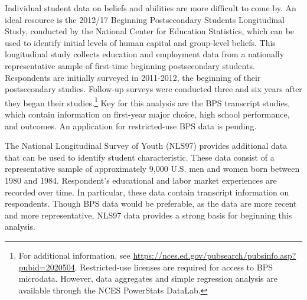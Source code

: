 Individual student data on beliefs and abilities are more difficult to come by.
An ideal resource is the 2012/17 Beginning Postsecondary Students Longitudinal Study, conducted by the National Center for Education Statistics, which can be used to identify initial levels of human capital and group-level beliefs. 
This longitudinal study collects education and employment data from a nationally representative sample of first-time beginning postsecondary students.
Respondents are initially surveyed in 2011-2012, the beginning of their postsecondary studies. 
Follow-up surveys were conducted three and six years after they began their studies.\footnote{
    For additional information, see \url{https://nces.ed.gov/pubsearch/pubsinfo.asp?pubid=2020504}.
    Restricted-use licenses are required for access to BPS microdata. 
    However, data aggregates and simple regression analysis are available through the NCES PowerStats DataLab. 
}
Key for this analysis are the BPS transcript studies, which contain information on first-year major choice, high school performance, and outcomes. 
An application for restricted-use BPS data is pending. 

The National Longitudinal Survey of Youth (NLS97) provides additional data that can be used to identify student characteristic.
These data consist of a representative sample of approximately 9,000 U.S. men and women born between 1980 and 1984.
Respondent's educational and labor market experiences are recorded over time. 
In particular, these data contain transcript information on respondents.
Though BPS data would be preferable, as the data are more recent and more representative, NLS97 data provides a strong basis for beginning this analysis.  

